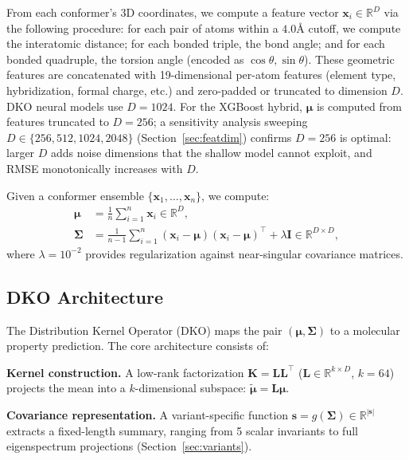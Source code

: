 \documentclass[sigconf]{acmart}
\begin{document}
From each conformer's 3D coordinates, we compute a feature vector $\mathbf{x}_i \in \mathbb{R}^D$ via the following procedure: for each pair of atoms within a $4.0$\AA{} cutoff, we compute the interatomic distance; for each bonded triple, the bond angle; and for each bonded quadruple, the torsion angle (encoded as $\cos\theta, \sin\theta$). These geometric features are concatenated with 19-dimensional per-atom features (element type, hybridization, formal charge, etc.) and zero-padded or truncated to dimension $D$. DKO neural models use $D = 1024$. For the XGBoost hybrid, $\boldsymbol{\mu}$ is computed from features truncated to $D = 256$; a sensitivity analysis sweeping $D \in \{256, 512, 1024, 2048\}$ (Section~\ref{sec:featdim}) confirms $D = 256$ is optimal: larger $D$ adds noise dimensions that the shallow model cannot exploit, and RMSE monotonically increases with $D$.

Given a conformer ensemble $\{\mathbf{x}_1, \ldots, \mathbf{x}_n\}$, we compute:
\begin{align}
    \boldsymbol{\mu} &= \frac{1}{n}\sum_{i=1}^{n} \mathbf{x}_i \in \mathbb{R}^D, \label{eq:mu} \\
    \boldsymbol{\Sigma} &= \frac{1}{n-1}\sum_{i=1}^{n}(\mathbf{x}_i - \boldsymbol{\mu})(\mathbf{x}_i - \boldsymbol{\mu})^\top + \lambda\mathbf{I} \in \mathbb{R}^{D \times D}, \label{eq:sigma}
\end{align}
where $\lambda = 10^{-2}$ provides regularization against near-singular covariance matrices.

\subsection{DKO Architecture}

The Distribution Kernel Operator (DKO) maps the pair $(\boldsymbol{\mu}, \boldsymbol{\Sigma})$ to a molecular property prediction. The core architecture consists of:

\textbf{Kernel construction.} A low-rank factorization $\mathbf{K} = \mathbf{L}\mathbf{L}^\top$ ($\mathbf{L} \in \mathbb{R}^{k \times D}$, $k = 64$) projects the mean into a $k$-dimensional subspace: $\tilde{\boldsymbol{\mu}} = \mathbf{L}\boldsymbol{\mu}$.

\textbf{Covariance representation.} A variant-specific function $\mathbf{s} = g(\boldsymbol{\Sigma}) \in \mathbb{R}^{|\mathbf{s}|}$ extracts a fixed-length summary, ranging from 5 scalar invariants to full eigenspectrum projections (Section~\ref{sec:variants}).
\end{document}
